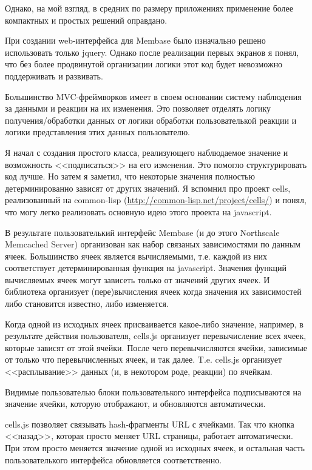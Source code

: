 \documentclass[10pt, a5paper]{article}
\begin{document}
Однако, на мой взгляд, в средних по размеру приложениях применение более
компактных и простых решений оправдано.

При создании web-интерфейса для Membase было изначально решено
использовать только jquery. Однако после реализации первых экранов я
понял, что без более продвинутой организации логики этот код будет
невозможно поддерживать и развивать.

Большинство MVC-фреймворков имеет в своем основании систему наблюдения
за данными и реакции на их изменения. Это позволяет отделять логику
получения/обработки данных от логики обработки пользователькой реакции
и логики представления этих данных пользователю.

Я начал с создания простого класса, реализующего наблюдаемое значение и
возможность <<подписаться>> на его измeнения. Это помогло
структурировать код лучше. Но затем я заметил, что некоторые значения
полностью детерминированно зависят от других значений. Я вспомнил про
проект cells, реализованный на common-lisp 
(\url{http://common-lisp.net/project/cells/}) и понял, что могу легко
реализовать основную идею этого проекта на javascript.

В результате пользователький интерфейс Membase (и до этого Northscale
Memcached Server) организован как набор связаных зависимостями по
данным ячеек. Большинство ячеек является вычисляемыми, т.е. каждой из
них соответствует детерминированная функция на javascript. Значения
функций вычисляемых ячеек могут зависеть только от значений других
ячеек. И библиотека организует (пере)вычисления ячеек когда значения
их зависимостей либо становится известно, либо изменяется.

Когда одной из исходных ячеек присваивается какое-либо значение,
например, в результате действия пользователя, cells.js организует
перевычисление всех ячеек, которые зависят от этой ячейки. После чего
перевычисляются ячейки, зависимые от только что перевычисленных ячеек, и
так далее. T.e. cells.js организует <<расплывание>> данных (и, в
некотором роде, реакции) по ячейкам.

Видимые пользователью блоки пользователького интерфейса подписываются
на значениe ячейки, которую отображают, и обновляются автоматически.

cells.js позволяет связывать hash-фрагменты URL с ячейками. Так что
кнопка <<назад>>, которая просто меняет URL страницы, работает
автоматически. При этом просто меняется значение одной из исходных
ячеек, и остальная часть пользователького интерфейса обновляется
соответственно.
\end{document}
